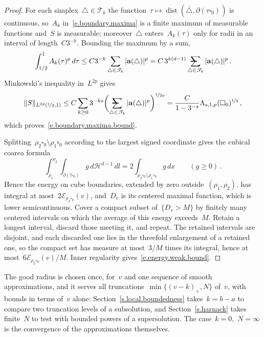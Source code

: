 \documentclass[11pt,letterpaper]{article}
\makeatletter
\numberwithin{equation}{section}
\theoremstyle{definition}
\renewcommand{\a}{\mathbf{a}}
\newcommand{\nf}{\nicefrac}
\newcommand{\cu}{\square}
\DeclareMathOperator{\dist}{dist}
\DeclarePairedDelimiter{\norm}{\lVert}{\rVert}
\newcommand{\Ener}{\mathcal E}
\newcommand{\avsum}{\mathop{\mathpalette\avsuminner\relax}\displaylimits}
\newcommand\avsuminner[2]{%
	{\sbox0{$\m@th#1\sum$}%
		\vphantom{\usebox0}%
		\ooalign{%
			\hidewidth
			\smash{\,\rule[.23em]{8.8pt}{1.1pt} \relax}%
			\hidewidth\cr
			$\m@th#1\sum$\cr
		}%
	}%
}
\makeatother
\begin{document}
\begin{proof}
For each simplex~$\triangle\in\mathscr T_k$ the function~$\tau\mapsto\dist(\overline\triangle,\partial(\tau\cu_0))$ is continuous, so~$A_k$ in~\eqref{e.boundary.maxima} is a finite maximum of measurable functions and~$S$ is measurable; moreover~$\triangle$ enters~$A_k(\tau)$ only for radii in an interval of length~$C3^{-k}$. Bounding the maximum by a sum,
\begin{equation*}
	\int_{1/2}^1 A_k(\tau)^p\,d\tau\leq C3^{-k}\sum_{\triangle\in\mathscr T_k}|\a(\triangle)|^p=C\,3^{k(d-1)}\avsum_{\triangle\in\mathscr T_k}|\a(\triangle)|^p\,.
\end{equation*}
Minkowski's inequality in~$L^{2p}$ gives
\begin{equation*}
	\norm{S}_{L^{2p}(\nf12,1)}\leq C\sum_{k\geq0}3^{-ks}\biggl(\avsum_{\triangle\in\mathscr T_k}|\a(\triangle)|^p\biggr)^{\nf1{2p}}=\frac{C}{1-3^{-s}}\Lambda_{s,1,p}(\cu_0)^{\nf12}\,,
\end{equation*}
which proves~\eqref{e.boundary.maxima.bound}.

\smallskip

Splitting~$\rho_2\cu_0\setminus\rho_1\overline{\cu}_0$ according to the largest signed coordinate gives the cubical coarea formula
\begin{equation}
	\int_{\rho_1}^{\rho_2}\int_{\partial(l\cu_0)}g\,d\mathcal H^{d-1}\,dl=2\int_{\rho_2\cu_0\setminus\rho_1\overline{\cu}_0}g\,dx\qquad(g\geq0)\,.
	\label{e.cubical.coarea}
\end{equation}
Hence the energy on cube boundaries, extended by zero outside~$(\rho_1,\rho_2)$, has integral at most~$2\Ener_{\rho_2\cu_0}(v)$, and~$D_v$ is its centered maximal function, which is lower semicontinuous. Cover a compact subset of~$\{D_v>M\}$ by finitely many centered intervals on which the average of this energy exceeds~$M$. Retain a longest interval, discard those meeting it, and repeat. The retained intervals are disjoint, and each discarded one lies in the threefold enlargement of a retained one, so the compact set has measure at most~$3/M$ times its integral, hence at most~$6\Ener_{\rho_2\cu_0}(v)/M$. Inner regularity gives~\eqref{e.energy.weak.bound}.
\end{proof}

The good radius is chosen once, for~$v$ and one sequence of smooth approximations, and it serves all truncations~$\min\{(v-k)_+,N\}$ of~$v$, with bounds in terms of~$v$ alone: Section~\ref{s.local.boundedness} takes~$k=b-a$ to compare two truncation levels of a subsolution, and Section~\ref{s.harnack} takes finite~$N$ to test with bounded powers of a supersolution. The case~$k=0$,~$N=\infty$ is the convergence of the approximations themselves.
\end{document}
